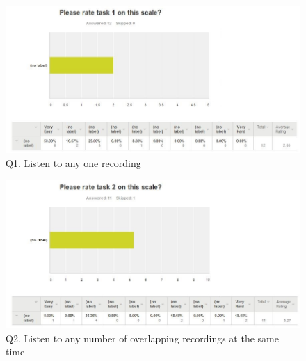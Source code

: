 \documentclass{l3proj}
\begin{document}
\begin{figure}[ht!]
\centering
\includegraphics[width=\textwidth]{images/question-1-stats.jpg}
\caption{Q1. Listen to any one recording}
\end{figure}
\begin{figure}[ht!]
\centering
\includegraphics[width=\textwidth]{images/question-2-stats.jpg}
\caption{Q2. Listen to any number of overlapping recordings at the same time}
\end{figure}
\end{document}
